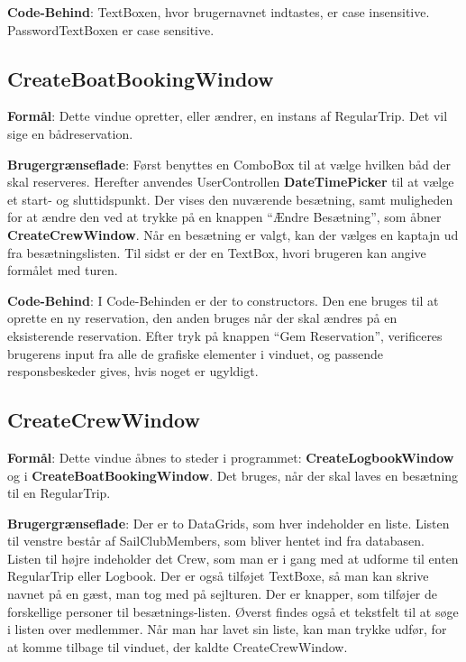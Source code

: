 \textbf{Code-Behind}: 
TextBoxen, hvor brugernavnet indtastes, er case insensitive.
PasswordTextBoxen er case sensitive. 

\subsection{CreateBoatBookingWindow}
\textbf{Formål}: 
Dette vindue opretter, eller ændrer, en instans af RegularTrip.
Det vil sige en bådreservation. 

\textbf{Brugergrænseflade}: 
Først benyttes en ComboBox til at vælge hvilken båd der skal reserveres.
Herefter anvendes UserControllen \textbf{DateTimePicker} til at vælge et start- og sluttidspunkt.
Der vises den nuværende besætning, samt muligheden for at ændre den ved at trykke på en knappen ``Ændre Besætning'', som åbner \textbf{CreateCrewWindow}.
Når en besætning er valgt, kan der vælges en kaptajn ud fra besætningslisten.
Til sidst er der en TextBox, hvori brugeren kan angive formålet med turen.

\textbf{Code-Behind}: 
I Code-Behinden er der to constructors. 
Den ene bruges til at oprette en ny reservation, den anden bruges når der skal ændres på en eksisterende reservation. 
Efter tryk på knappen ``Gem Reservation'', verificeres brugerens input fra alle de grafiske elementer i vinduet, og passende responsbeskeder gives, hvis noget er ugyldigt.

\subsection{CreateCrewWindow}

\textbf{Formål}: Dette vindue åbnes to steder i programmet: \textbf{CreateLogbookWindow} og i \textbf{CreateBoatBookingWindow}. 
Det bruges, når der skal laves en besætning til en RegularTrip.  

\textbf{Brugergrænseflade}: 
Der er to DataGrids, som hver indeholder en liste. 
Listen til venstre består af SailClubMembers, som bliver hentet ind fra databasen. 
Listen til højre indeholder det Crew, som man er i gang med at udforme til enten RegularTrip eller Logbook. 
Der er også tilføjet TextBoxe, så man kan skrive navnet på en gæst, man tog med på sejlturen. 
Der er knapper, som tilføjer de forskellige personer til besætnings-listen. 
Øverst findes også et tekstfelt til at søge i listen over medlemmer. 
Når man har lavet sin liste, kan man trykke udfør, for at komme tilbage til vinduet, der kaldte CreateCrewWindow.

